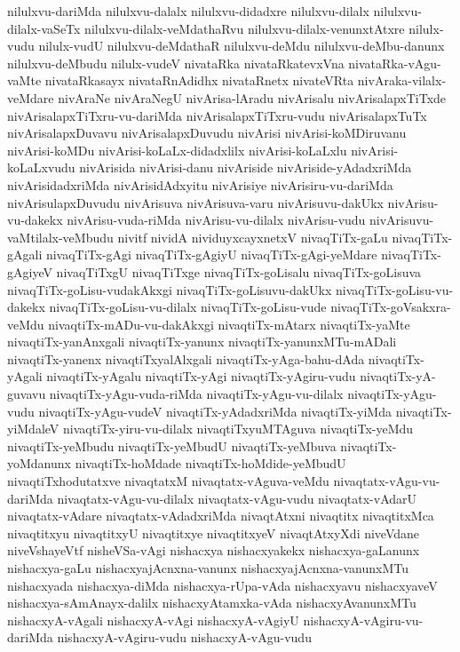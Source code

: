 {nilulxvu-dariMda
nilulxvu-dalalx
nilulxvu-didadxre
nilulxvu-dilalx
nilulxvu-dilalx-vaSeTx
nilulxvu-dilalx-veMdathaRvu
nilulxvu-dilalx-venunxtAtxre
nilulx-vudu
nilulx-vudU
nilulxvu-deMdathaR
nilulxvu-deMdu
nilulxvu-deMbu-danunx
nilulxvu-deMbudu
nilulx-vudeV
nivataRka
nivataRkatevxVna
nivataRka-vAgu-vaMte
nivataRkasayx
nivataRnAdidhx
nivataRnetx
nivateVRta
nivAraka-vilalx-veMdare
nivAraNe
nivAraNegU
nivArisa-lAradu
nivArisalu
nivArisalapxTiTxde
nivArisalapxTiTxru-vu-dariMda
nivArisalapxTiTxru-vudu
nivArisalapxTuTx
nivArisalapxDuvavu
nivArisalapxDuvudu
nivArisi
nivArisi-koMDiruvanu
nivArisi-koMDu
nivArisi-koLaLx-didadxlilx
nivArisi-koLaLxlu
nivArisi-koLaLxvudu
nivArisida
nivArisi-danu
nivAriside
nivAriside-yAdadxriMda
nivArisidadxriMda
nivArisidAdxyitu
nivArisiye
nivArisiru-vu-dariMda
nivArisulapxDuvudu
nivArisuva
nivArisuva-varu
nivArisuvu-dakUkx
nivArisu-vu-dakekx
nivArisu-vuda-riMda
nivArisu-vu-dilalx
nivArisu-vudu
nivArisuvu-vaMtilalx-veMbudu
nivitf
nividA
nividuyxcayxnetxV
nivaqTiTx-gaLu
nivaqTiTx-gAgali
nivaqTiTx-gAgi
nivaqTiTx-gAgiyU
nivaqTiTx-gAgi-yeMdare
nivaqTiTx-gAgiyeV
nivaqTiTxgU
nivaqTiTxge
nivaqTiTx-goLisalu
nivaqTiTx-goLisuva
nivaqTiTx-goLisu-vudakAkxgi
nivaqTiTx-goLisuvu-dakUkx
nivaqTiTx-goLisu-vu-dakekx
nivaqTiTx-goLisu-vu-dilalx
nivaqTiTx-goLisu-vude
nivaqTiTx-goVsakxra-veMdu
nivaqtiTx-mADu-vu-dakAkxgi
nivaqtiTx-mAtarx
nivaqtiTx-yaMte
nivaqtiTx-yanAnxgali
nivaqtiTx-yanunx
nivaqtiTx-yanunxMTu-mADali
nivaqtiTx-yanenx
nivaqtiTxyalAlxgali
nivaqtiTx-yAga-bahu-dAda
nivaqtiTx-yAgali
nivaqtiTx-yAgalu
nivaqtiTx-yAgi
nivaqtiTx-yAgiru-vudu
nivaqtiTx-yA-guvavu
nivaqtiTx-yAgu-vuda-riMda
nivaqtiTx-yAgu-vu-dilalx
nivaqtiTx-yAgu-vudu
nivaqtiTx-yAgu-vudeV
nivaqtiTx-yAdadxriMda
nivaqtiTx-yiMda
nivaqtiTx-yiMdaleV
nivaqtiTx-yiru-vu-dilalx
nivaqtiTxyuMTAguva
nivaqtiTx-yeMdu
nivaqtiTx-yeMbudu
nivaqtiTx-yeMbudU
nivaqtiTx-yeMbuva
nivaqtiTx-yoMdanunx
nivaqtiTx-hoMdade
nivaqtiTx-hoMdide-yeMbudU
nivaqtiTxhodutatxve
nivaqtatxM
nivaqtatx-vAguva-veMdu
nivaqtatx-vAgu-vu-dariMda
nivaqtatx-vAgu-vu-dilalx
nivaqtatx-vAgu-vudu
nivaqtatx-vAdarU
nivaqtatx-vAdare
nivaqtatx-vAdadxriMda
nivaqtAtxni
nivaqtitx
nivaqtitxMca
nivaqtitxyu
nivaqtitxyU
nivaqtitxye
nivaqtitxyeV
nivaqtAtxyXdi
niveVdane
niveVshayeVtf
nisheVSa-vAgi
nishacxya
nishacxyakekx
nishacxya-gaLanunx
nishacxya-gaLu
nishacxyajAcnxna-vanunx
nishacxyajAcnxna-vanunxMTu
nishacxyada
nishacxya-diMda
nishacxya-rUpa-vAda
nishacxyavu
nishacxyaveV
nishacxya-sAmAnayx-dalilx
nishacxyAtamxka-vAda
nishacxyAvanunxMTu
nishacxyA-vAgali
nishacxyA-vAgi
nishacxyA-vAgiyU
nishacxyA-vAgiru-vu-dariMda
nishacxyA-vAgiru-vudu
nishacxyA-vAgu-vudu
}
